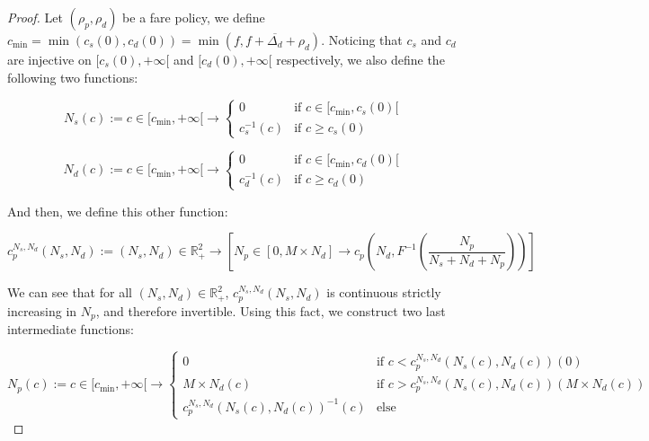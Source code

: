 \documentclass[english, a4paper]{article}
\theoremstyle{plain}
\theoremstyle{definition}
\theoremstyle{remark}
\begin{document}
\begin{proof}
    Let $(\rho_p, \rho_d)$ be a fare policy, we define $c_{\text{min}} = \min (c_s(0), c_d(0)) = \min (f, f + \overline{\Delta _d} + \rho _d)$. Noticing that $c_s$ and $c_d$ are injective on $[c_s(0), +\infty[$ and $[c_d(0), +\infty[$ respectively, we also define the following two functions:
    
    \begin{equation}
        N_s(c):= c\in [c_{\text{min}}, +\infty[ \longrightarrow \left\{
        \begin{array}{lr}
            0 & \text{if } c \in [c_{\text{min}}, c_s(0)[\\
            c_s^{-1}(c) & \text{if } c \geq c_s(0)
        \end{array}
        \right.
    \end{equation}

    \begin{equation}
        N_d(c):= c\in [c_{\text{min}}, +\infty[ \longrightarrow \left\{
        \begin{array}{lr}
            0 & \text{if } c \in [c_{\text{min}}, c_d(0)[\\
            c_d^{-1}(c) & \text{if } c \geq c_d(0)
        \end{array}
        \right.
    \end{equation}

    And then, we define this other function:

    \begin{equation}
        c_p^{N_s, N_d}(N_s, N_d):= (N_s, N_d) \in \mathbb{R} _{+}^2 \longrightarrow \left[ N_p \in [0, M\times N_d] \longrightarrow c_p\left( N_d, F^{-1}\left(\frac{N_p}{N_s + N_d + N_p} \right) \right) \right]
    \end{equation}

    We can see that for all $(N_s, N_d) \in \mathbb{R} _{+}^2$, $c_p^{N_s, N_d}(N_s, N_d)$ is continuous strictly increasing in $N_p$, and therefore invertible. Using this fact, we construct two last intermediate functions:

    \begin{equation}
        N_p(c):= c\in [c_{\text{min}}, +\infty[ \longrightarrow
        \left\{
        \begin{array}{lr}
            0 & \text{if } c < c_p^{N_s, N_d} (N_s(c), N_d(c))(0)\\
            M\times N_d(c) & \text{if } c > c_p^{N_s, N_d} (N_s(c), N_d(c))(M\times N_d(c))\\
            c_p^{N_s, N_d} (N_s(c), N_d(c)) ^{-1} (c) & \text{else}
        \end{array}
        \right.
    \end{equation}


\end{proof}
\end{document}
